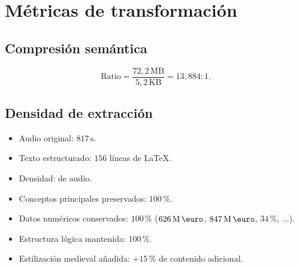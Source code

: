 \documentclass{claudeeditorial}
\begin{document}
\section{Métricas de transformación}

\subsection{Compresión semántica}
\[
  \text{Ratio} = \frac{72{,}2\,\text{MB}}{5{,}2\,\text{KB}} = \boxed{13{,}884:1}.
\]

\subsection{Densidad de extracción}
\begin{itemize}
\item Audio original: $817\,\text{s}$.
\item Texto estructurado: $156$ líneas de LaTeX.
\item Densidad:  de audio.
\end{itemize}

\begin{ClaudeCheck}
\begin{itemize}[leftmargin=1.2em,nosep]
\item Conceptos principales preservados: \textbf{\textcolor{claudeTerracotta}{$100\,\%$}}.
\item Datos numéricos conservados: $100\,\%$ ($626\,\text{M\,\euro}$, $847\,\text{M\,\euro}$, $34\,\%$, $\ldots$).
\item Estructura lógica mantenida: $100\,\%$.
\item Estilización medieval añadida: $+15\,\%$ de contenido adicional.
\end{itemize}
\end{ClaudeCheck}

\end{document}
